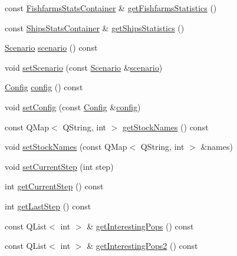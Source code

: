 \begin{DoxyCompactItemize}
\item 
const \mbox{\hyperlink{class_displace_model_a79e0e2511f2c59cd7d5e8518ffc8ab17}{Fishfarms\+Stats\+Container}} \& \mbox{\hyperlink{class_displace_model_ad36c89ca59516d24824d8704bbf30771}{get\+Fishfarms\+Statistics}} ()
\item 
const \mbox{\hyperlink{class_displace_model_a726f3fa27d4963a1cf7a396b26c64a4e}{Ships\+Stats\+Container}} \& \mbox{\hyperlink{class_displace_model_aecef0170e5f74d43ee44203b0b96e292}{get\+Ships\+Statistics}} ()
\item 
\mbox{\hyperlink{class_scenario}{Scenario}} \mbox{\hyperlink{class_displace_model_a0f061c0e36e65c7999fb2e4d3187e6ea}{scenario}} () const
\item 
void \mbox{\hyperlink{class_displace_model_a83a43265a9b032811b090058e938792c}{set\+Scenario}} (const \mbox{\hyperlink{class_scenario}{Scenario}} \&\mbox{\hyperlink{class_displace_model_a0f061c0e36e65c7999fb2e4d3187e6ea}{scenario}})
\item 
\mbox{\hyperlink{class_config}{Config}} \mbox{\hyperlink{class_displace_model_ac7848be5f0ed85cdfd8eace56bbcb30f}{config}} () const
\item 
void \mbox{\hyperlink{class_displace_model_a7576065fbd4fdc52099dfc50e6724d74}{set\+Config}} (const \mbox{\hyperlink{class_config}{Config}} \&\mbox{\hyperlink{class_displace_model_ac7848be5f0ed85cdfd8eace56bbcb30f}{config}})
\item 
const Q\+Map$<$ Q\+String, int $>$ \mbox{\hyperlink{class_displace_model_af6b437a1a160ca0b8b95184a95c32b11}{get\+Stock\+Names}} () const
\item 
void \mbox{\hyperlink{class_displace_model_accae3c9f9c7720e2c048897bd6d874d6}{set\+Stock\+Names}} (const Q\+Map$<$ Q\+String, int $>$ \&names)
\item 
void \mbox{\hyperlink{class_displace_model_a5e08e5cd4b5ddfeba8e903881d3e78b5}{set\+Current\+Step}} (int step)
\item 
int \mbox{\hyperlink{class_displace_model_a5eac67eac3f050ca5f3645f5ead8a299}{get\+Current\+Step}} () const
\item 
int \mbox{\hyperlink{class_displace_model_a9ebadd447909bf6445c509fd9769934f}{get\+Last\+Step}} () const
\item 
const Q\+List$<$ int $>$ \& \mbox{\hyperlink{class_displace_model_a95deb9ec411521da932424a4161cff26}{get\+Interesting\+Pops}} () const
\item 
const Q\+List$<$ int $>$ \& \mbox{\hyperlink{class_displace_model_a088dd1692b3779724d174b17f6a79514}{get\+Interesting\+Pops2}} () const

\end{DoxyCompactItemize}
